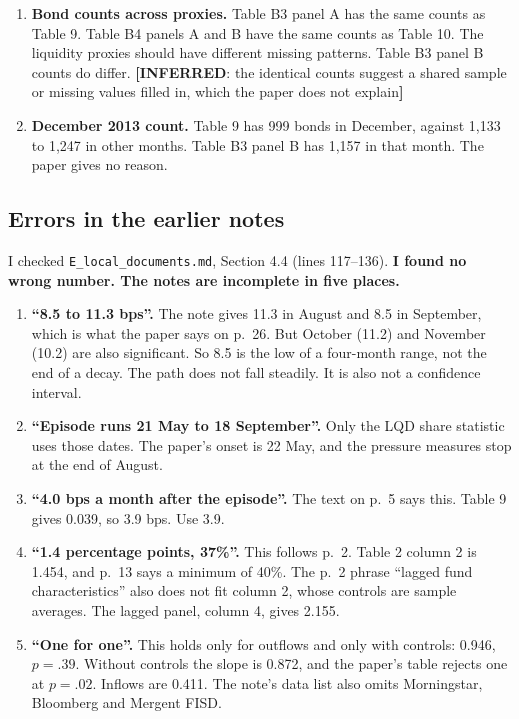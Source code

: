 \documentclass[10pt,a4paper]{article}
\newcommand{\IN}[1]{\textcolor{cin}{\textbf{[INFERRED}: #1\textbf{]}}}
\begin{document}
\begin{enumerate}
\item \textbf{Bond counts across proxies.} Table B3 panel A has the same counts as Table 9. Table B4 panels A and B have the same counts as Table 10. The liquidity proxies should have different missing patterns. Table B3 panel B counts do differ. \IN{the identical counts suggest a shared sample or missing values filled in, which the paper does not explain}
\item \textbf{December 2013 count.} Table 9 has 999 bonds in December, against 1,133 to 1,247 in other months. Table B3 panel B has 1,157 in that month. The paper gives no reason.
\end{enumerate}

\subsection{Errors in the earlier notes}
I checked \texttt{E\_local\_documents.md}, Section 4.4 (lines 117--136). \textbf{I found no wrong number. The notes are incomplete in five places.}
\begin{enumerate}
\item \textbf{``8.5 to 11.3 bps''.} The note gives 11.3 in August and 8.5 in September, which is what the paper says on p.~26. But October (11.2) and November (10.2) are also significant. So 8.5 is the low of a four-month range, not the end of a decay. The path does not fall steadily. It is also not a confidence interval.
\item \textbf{``Episode runs 21 May to 18 September''.} Only the LQD share statistic uses those dates. The paper's onset is 22 May, and the pressure measures stop at the end of August.
\item \textbf{``4.0 bps a month after the episode''.} The text on p.~5 says this. Table 9 gives 0.039, so 3.9 bps. Use 3.9.
\item \textbf{``1.4 percentage points, 37\%''.} This follows p.~2. Table 2 column 2 is 1.454, and p.~13 says a minimum of 40\%. The p.~2 phrase ``lagged fund characteristics'' also does not fit column 2, whose controls are sample averages. The lagged panel, column 4, gives 2.155.
\item \textbf{``One for one''.} This holds only for outflows and only with controls: 0.946, $p=.39$. Without controls the slope is 0.872, and the paper's table rejects one at $p=.02$. Inflows are 0.411. The note's data list also omits Morningstar, Bloomberg and Mergent FISD.
\end{enumerate}
\end{document}
